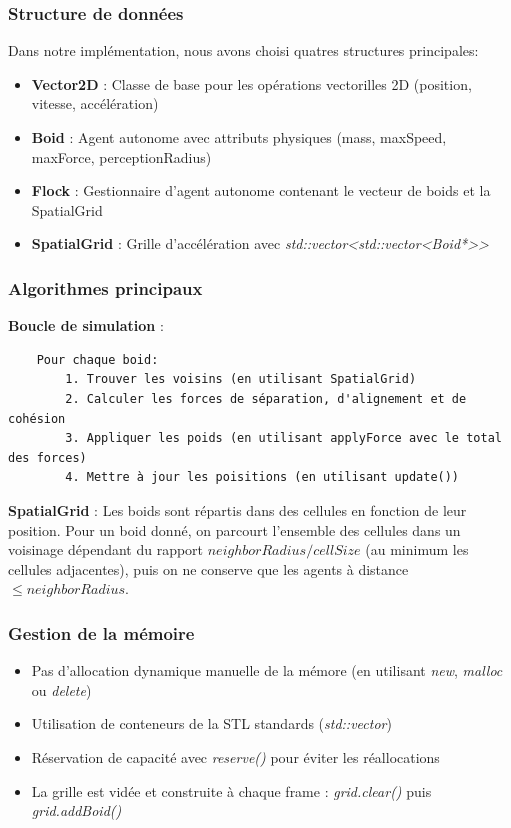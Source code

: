 \documentclass[11pt,a4paper]{article}
\begin{document}
\subsubsection{Structure de données}
Dans notre implémentation, nous avons choisi quatres structures principales:

\begin{itemize}
    \item \textbf{Vector2D} : Classe de base pour les opérations vectorilles 2D (position, vitesse, accélération)
    \item \textbf{Boid} : Agent autonome avec attributs physiques (mass, maxSpeed, maxForce, perceptionRadius)
    \item \textbf{Flock} : Gestionnaire d'agent autonome contenant le vecteur de boids et la SpatialGrid
    \item \textbf{SpatialGrid} : Grille d'accélération avec \textit{std::vector<std::vector<Boid*>>}
\end{itemize}

\subsubsection{Algorithmes principaux}

\textbf{Boucle de simulation} :
\begin{verbatim}
    Pour chaque boid:
        1. Trouver les voisins (en utilisant SpatialGrid)
        2. Calculer les forces de séparation, d'alignement et de cohésion
        3. Appliquer les poids (en utilisant applyForce avec le total des forces)
        4. Mettre à jour les poisitions (en utilisant update())
\end{verbatim}

\textbf{SpatialGrid} : Les boids sont répartis dans des cellules en fonction de leur position. Pour un boid donné, on parcourt l'ensemble des cellules dans un voisinage dépendant du rapport $neighborRadius / cellSize$ (au minimum les cellules adjacentes), puis on ne conserve que les agents à distance $\le neighborRadius$.

\subsubsection{Gestion de la mémoire}

\begin{itemize}
    \item Pas d'allocation dynamique manuelle de la mémore (en utilisant \textit{new}, \textit{malloc} ou \textit{delete})
    \item Utilisation de conteneurs de la STL standards (\textit{std::vector})
    \item Réservation de capacité avec \textit{reserve()} pour éviter les réallocations
    \item La grille est vidée et construite à chaque frame : \textit{grid.clear()} puis \textit{grid.addBoid()}
\end{itemize}
\end{document}
